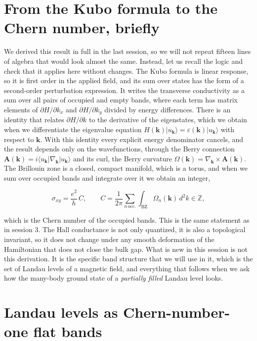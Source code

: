 \section{From the Kubo formula to the Chern number, briefly}

We derived this result in full in the last session, so we will not repeat fifteen lines of algebra
that would look almost the same. Instead, let us recall the logic and check that it applies here
without changes. The Kubo formula is linear response, so it is first order in the applied field,
and its sum over states has the form of a second-order perturbation expression. It writes the
transverse conductivity as a sum over all pairs of occupied and empty bands, where each term has
matrix elements of $\partial H/\partial k_x$ and $\partial H/\partial k_y$ divided by energy
differences. There is an identity that relates $\partial H/\partial k$ to the derivative of the
eigenstates, which we obtain when we differentiate the eigenvalue equation
$H(\mathbf{k})|u_\mathbf{k}\rangle = \varepsilon(\mathbf{k})|u_\mathbf{k}\rangle$ with respect to
$\mathbf{k}$. With this identity every explicit energy denominator cancels, and the result depends
only on the wavefunctions, through the Berry connection $\mathbf{A}(\mathbf{k}) = i\langle
u_\mathbf{k}|\nabla_\mathbf{k}|u_\mathbf{k}\rangle$ and its curl, the Berry curvature
$\Omega(\mathbf{k}) = \nabla_\mathbf{k}\times\mathbf{A}(\mathbf{k})$. The Brillouin zone is a
closed, compact manifold, which is a torus, and when we sum over occupied bands and integrate over
it we obtain an integer,

\begin{equation}
\sigma_{xy} = \frac{e^2}{h}\, C, \qquad C = \frac{1}{2\pi}\sum_{n\,\text{occ.}}\int_{\text{BZ}} \Omega_n(\mathbf{k})\, d^2k \in \mathbb{Z},
\end{equation}

which is the Chern number of the occupied bands. This is the same statement as in session 3. The
Hall conductance is not only quantized, it is also a topological invariant, so it does not change
under any smooth deformation of the Hamiltonian that does not close the bulk gap. What is new in
this session is not this derivation. It is the specific band structure that we will use in it,
which is the set of Landau levels of a magnetic field, and everything that follows when we ask how
the many-body ground state of a \emph{partially filled} Landau level looks.

\section{Landau levels as Chern-number-one flat bands}

